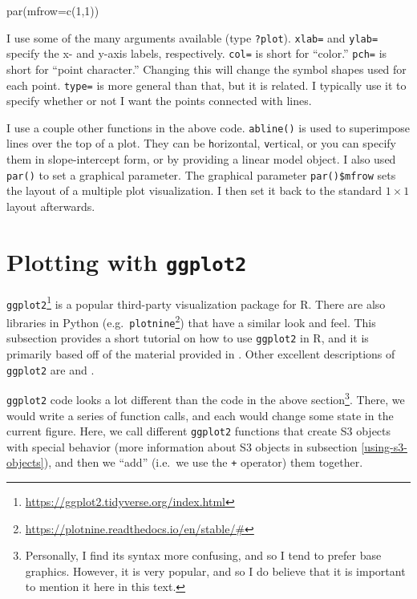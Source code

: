 \documentclass[
  12pt,
  krantz2]{krantz}
\makeatletter
\newenvironment{Shaded}{\begin{snugshade}}{\end{snugshade}}
\newcommand{\AttributeTok}[1]{\textcolor[rgb]{0.61,0.61,0.61}{#1}}
\newcommand{\DecValTok}[1]{\textcolor[rgb]{0.06,0.06,0.06}{#1}}
\newcommand{\FunctionTok}[1]{\textcolor[rgb]{0,0,0}{#1}}
\newcommand{\NormalTok}[1]{#1}
\renewcommand{\href}[2]{#2\footnote{\url{#1}}}
\newenvironment{kframe}{%
\medskip{}
\setlength{\fboxsep}{.8em}
 \def\at@end@of@kframe{}%
 \ifinner\ifhmode%
  \def\at@end@of@kframe{\end{minipage}}%
  \begin{minipage}{\columnwidth}%
 \fi\fi%
 \def\FrameCommand##1{\hskip\@totalleftmargin \hskip-\fboxsep
 \colorbox{shadecolor}{##1}\hskip-\fboxsep
     \hskip-\linewidth \hskip-\@totalleftmargin \hskip\columnwidth}%
 \MakeFramed {\advance\hsize-\width
   \@totalleftmargin\z@ \linewidth\hsize
   \@setminipage}}%
 {\par\unskip\endMakeFramed%
 \at@end@of@kframe}
\renewenvironment{Shaded}{\begin{kframe}}{\end{kframe}}
\makeatother
\begin{document}
\begin{Shaded}
\begin{Highlighting}[]
\FunctionTok{par}\NormalTok{(}\AttributeTok{mfrow=}\FunctionTok{c}\NormalTok{(}\DecValTok{1}\NormalTok{,}\DecValTok{1}\NormalTok{))}
\end{Highlighting}
\end{Shaded}

I use some of the many arguments available (type \texttt{?plot}). \texttt{xlab=} and \texttt{ylab=} specify the x- and y-axis labels, respectively. \texttt{col=} is short for ``color.'' \texttt{pch=} is short for ``point character.'' Changing this will change the symbol shapes used for each point. \texttt{type=} is more general than that, but it is related. I typically use it to specify whether or not I want the points connected with lines.

I use a couple other functions in the above code. \texttt{abline()} is used to superimpose lines over the top of a plot. They can be \texttt{h}orizontal, \texttt{v}ertical, or you can specify them in slope-intercept form, or by providing a linear model object. I also used \texttt{par()} to set a graphical parameter. The graphical parameter \texttt{par()\$mfrow} sets the layout of a multiple plot visualization. I then set it back to the standard \(1 \times 1\) layout afterwards.

\hypertarget{plotting-with-ggplot2}{%
\section{\texorpdfstring{Plotting with \texttt{ggplot2}}{Plotting with ggplot2}}\label{plotting-with-ggplot2}}

\href{https://ggplot2.tidyverse.org/index.html}{\texttt{ggplot2}} is a popular third-party visualization package for R. There are also libraries in Python (e.g.~\href{https://plotnine.readthedocs.io/en/stable/\#}{\texttt{plotnine}}) that have a similar look and feel. This subsection provides a short tutorial on how to use \texttt{ggplot2} in R, and it is primarily based off of the material provided in \citep{ggplot2}. Other excellent descriptions of \texttt{ggplot2} are \citep{r_in_action} and \citep{r_graphics_cookbook}.

\texttt{ggplot2} code looks a lot different than the code in the above section\footnote{Personally, I find its syntax more confusing, and so I tend to prefer base graphics. However, it is very popular, and so I do believe that it is important to mention it here in this text.}. There, we would write a series of function calls, and each would change some state in the current figure. Here, we call different \texttt{ggplot2} functions that create S3 objects with special behavior (more information about S3 objects in subsection \ref{using-s3-objects}), and then we ``add'' (i.e.~we use the \texttt{+} operator) them together.
\end{document}
